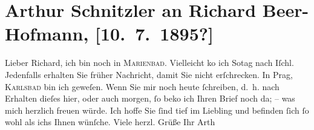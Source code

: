 

         
         \renewcommand{\erwaehntePersonen}{Personen: Richard Beer-Hofmann}
         \renewcommand{\erwaehnteOrte}{Orte: Bad Ischl, Karlsbad, Marienbad, Prag}
         \renewcommand{\erwaehnteWerke}{Werke: Der Tod Georgs}
               \section[Arthur Schnitzler an Richard Beer-Hofmann, {[}10. 7. 1895?{]}]{ Arthur Schnitzler an Richard Beer-Hofmann, {[}10. 7. 1895?{]}}\nopagebreak{}\rehead{ }\begin{ledgroupsized}[t]{13cm}\normalsize\beginnumbering \toendnotes[C]{\smallbreak\pagebreak[2]} 
\pstart
           \noindent{}{\pb}Lieber Richard, ich bin noch in \textsc{Marienbad}. Vielleicht ko{\geminationm} ich So{\geminationn}tag nach Iſchl. Jedenfalls erhalten Sie früher Nachricht, damit Sie nicht
               erſchrecken. In Prag, \textsc{Karlsbad} bin ich geweſen. Wenn Sie mir {\pb}noch heute
               ſchreiben, d. h. nach Erhalten dieſes hier, oder auch morgen, ſo beko{\geminationm} ich Ihren Brief noch da; – was mich herzlich freuen
               würde. Ich hoffe Sie ſind tief im Liebling und
               befinden ſich ſo wohl als ichs Ihnen wünſche.\pend
           \pstart Viele herzl. Grüße Ihr \spacefill\mbox{Arth}\pend{}
         
         \endnumbering{}\end{ledgroupsized}  \newcommand{\dateiname}{L00461}\newcommand{\titel}{Arthur Schnitzler an Richard Beer-Hofmann, [10. 7. 1895?]}\newcommand{\editorInnen}{Martin Anton Müller und Gerd-Hermann Susen}
      